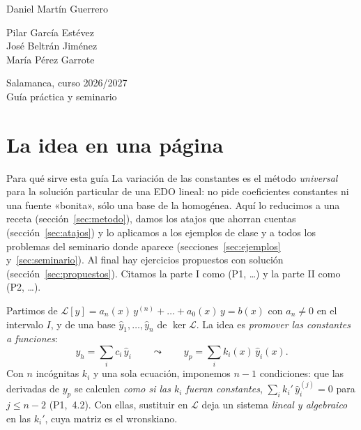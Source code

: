 \documentclass[11pt,twoside]{article}
\newcommand\Lop{\mathcal L}
\newcommand\yh{\hat y}
\newcommand\pI[1]{(P1,~#1)}
\begin{document}
\begin{titlepage}
\begin{minipage}[t]{0.32\textwidth}
{\small Daniel Martín Guerrero}
\end{minipage}\hfill
\begin{minipage}[t]{0.32\textwidth}\centering
{\color{acc}\footnotesize{}}\par\vspace{2pt}
{\small Pilar García Estévez\\ José Beltrán Jiménez\\ María Pérez Garrote}
\end{minipage}\hfill
\begin{minipage}[t]{0.32\textwidth}\raggedleft
{\color{acc}\footnotesize{}}\par\vspace{2pt}
{\small Salamanca, curso 2026/2027}\\[1pt]
{\footnotesize\color{muted}Guía práctica y seminario}
\end{minipage}
\end{titlepage}

\setcounter{page}{2}
{\hypersetup{linkcolor=fg}\tableofcontents}
\clearpage

\section{La idea en una página}\label{sec:idea}

\begin{motivacion}{Para qué sirve esta guía}
La variación de las constantes es el método \emph{universal} para la solución particular de una EDO lineal: no pide
coeficientes constantes ni una fuente «bonita», sólo una base de la homogénea. Aquí lo reducimos a una receta
(sección~\ref{sec:metodo}), damos los atajos que ahorran cuentas (sección~\ref{sec:atajos}) y lo aplicamos a los ejemplos
de clase y a todos los problemas del seminario donde aparece (secciones~\ref{sec:ejemplos} y~\ref{sec:seminario}). Al
final hay ejercicios propuestos con solución (sección~\ref{sec:propuestos}). Citamos la parte I como (P1, \dots) y la
parte II como (P2, \dots).
\end{motivacion}

Partimos de $\Lop[y]=a_n(x)\,y^{(n)}+\dots+a_0(x)\,y=b(x)$ con $a_n\neq0$ en el intervalo $I$, y de una base
$\yh_1,\dots,\yh_n$ de $\ker\Lop$. La idea es \emph{promover las constantes a funciones}:
\begin{equation}\label{eq:ansatz}
y_h=\sum_ic_i\,\yh_i\qquad\leadsto\qquad y_p=\sum_ik_i(x)\,\yh_i(x).
\end{equation}
Con $n$ incógnitas $k_i$ y una sola ecuación, imponemos $n-1$ condiciones: que las derivadas de $y_p$ se calculen
\emph{como si las $k_i$ fueran constantes}, $\sum_ik_i'\,\yh_i^{(j)}=0$ para $j\le n-2$ \pI{4.2}. Con ellas, sustituir en
$\Lop$ deja un sistema \emph{lineal y algebraico} en las $k_i'$, cuya matriz es el wronskiano.
\end{document}
